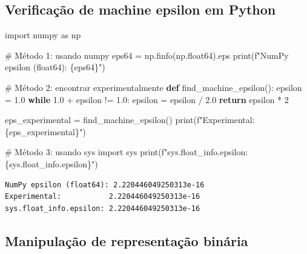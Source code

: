 \documentclass[
  11pt,
  letterpaper,
  DIV=11,
  numbers=noendperiod]{scrartcl}
\newenvironment{Shaded}{\begin{snugshade}}{\end{snugshade}}
\newcommand{\BuiltInTok}[1]{\textcolor[rgb]{0.00,0.23,0.31}{#1}}
\newcommand{\CommentTok}[1]{\textcolor[rgb]{0.37,0.37,0.37}{#1}}
\newcommand{\ControlFlowTok}[1]{\textcolor[rgb]{0.00,0.23,0.31}{\textbf{#1}}}
\newcommand{\DecValTok}[1]{\textcolor[rgb]{0.68,0.00,0.00}{#1}}
\newcommand{\FloatTok}[1]{\textcolor[rgb]{0.68,0.00,0.00}{#1}}
\newcommand{\ImportTok}[1]{\textcolor[rgb]{0.00,0.46,0.62}{#1}}
\newcommand{\KeywordTok}[1]{\textcolor[rgb]{0.00,0.23,0.31}{\textbf{#1}}}
\newcommand{\NormalTok}[1]{\textcolor[rgb]{0.00,0.23,0.31}{#1}}
\newcommand{\OperatorTok}[1]{\textcolor[rgb]{0.37,0.37,0.37}{#1}}
\newcommand{\SpecialCharTok}[1]{\textcolor[rgb]{0.37,0.37,0.37}{#1}}
\newcommand{\SpecialStringTok}[1]{\textcolor[rgb]{0.13,0.47,0.30}{#1}}
\begin{document}
\subsection{Verificação de machine epsilon em
Python}\label{verificauxe7uxe3o-de-machine-epsilon-em-python}

\begin{Shaded}
\begin{Highlighting}[]
\ImportTok{import}\NormalTok{ numpy }\ImportTok{as}\NormalTok{ np}

\CommentTok{\# Método 1: usando numpy}
\NormalTok{eps64 }\OperatorTok{=}\NormalTok{ np.finfo(np.float64).eps}
\BuiltInTok{print}\NormalTok{(}\SpecialStringTok{f"NumPy epsilon (float64): }\SpecialCharTok{\{}\NormalTok{eps64}\SpecialCharTok{\}}\SpecialStringTok{"}\NormalTok{)}

\CommentTok{\# Método 2: encontrar experimentalmente}
\KeywordTok{def}\NormalTok{ find\_machine\_epsilon():}
\NormalTok{    epsilon }\OperatorTok{=} \FloatTok{1.0}
    \ControlFlowTok{while} \FloatTok{1.0} \OperatorTok{+}\NormalTok{ epsilon }\OperatorTok{!=} \FloatTok{1.0}\NormalTok{:}
\NormalTok{        epsilon }\OperatorTok{=}\NormalTok{ epsilon }\OperatorTok{/} \FloatTok{2.0}
    \ControlFlowTok{return}\NormalTok{ epsilon }\OperatorTok{*} \DecValTok{2}

\NormalTok{eps\_experimental }\OperatorTok{=}\NormalTok{ find\_machine\_epsilon()}
\BuiltInTok{print}\NormalTok{(}\SpecialStringTok{f"Experimental:           }\SpecialCharTok{\{}\NormalTok{eps\_experimental}\SpecialCharTok{\}}\SpecialStringTok{"}\NormalTok{)}

\CommentTok{\# Método 3: usando sys}
\ImportTok{import}\NormalTok{ sys}
\BuiltInTok{print}\NormalTok{(}\SpecialStringTok{f"sys.float\_info.epsilon: }\SpecialCharTok{\{}\NormalTok{sys}\SpecialCharTok{.}\NormalTok{float\_info}\SpecialCharTok{.}\NormalTok{epsilon}\SpecialCharTok{\}}\SpecialStringTok{"}\NormalTok{)}
\end{Highlighting}
\end{Shaded}

\begin{verbatim}
NumPy epsilon (float64): 2.220446049250313e-16
Experimental:           2.220446049250313e-16
sys.float_info.epsilon: 2.220446049250313e-16
\end{verbatim}

\subsection{Manipulação de representação
binária}\label{manipulauxe7uxe3o-de-representauxe7uxe3o-binuxe1ria}
\end{document}
